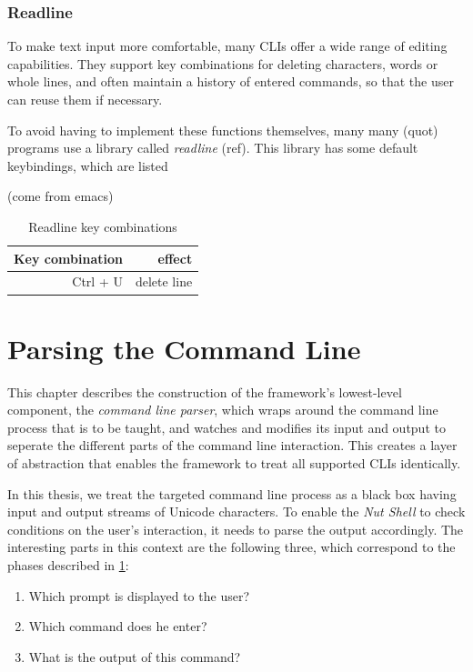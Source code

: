 \documentclass[paper=a4,twoside,abstract=on,cleardoublepage=empty,numbers=noenddot,toc=bib,12pt,appendixprefix=true]{scrreprt}
\begin{document}
\subsection{Readline}

To make text input more comfortable, many CLIs offer a wide range of editing capabilities. They support key combinations for deleting characters, words or whole lines, and often maintain a history of entered commands, so that the user can reuse them if necessary.

To avoid having to implement these functions themselves, many many (quot) programs use a library called \emph{readline} (ref). This library has some default keybindings, which are listed

(come from emacs)

\begin{table}[tb]
    \begin{tabular}{r|r}
        Key combination & effect \\
        \hline
        Ctrl + U & delete line \\
    \end{tabular}
    \caption{Readline key combinations}
\end{table}


\chapter{Parsing the Command Line}
\label{sec:cli}

This chapter describes the construction of the framework's lowest-level component, the \emph{command line parser}, which wraps around the command line process that is to be taught, and watches and modifies its input and output to seperate the different parts of the command line interaction. This creates a layer of abstraction that enables the framework to treat all supported CLIs identically.

In this thesis, we treat the targeted command line process as a black box having input and output streams of Unicode characters. To enable the \emph{Nut Shell} to check conditions on the user's interaction, it needs to parse the output accordingly. The interesting parts in this context are the following three, which correspond to the phases described in \cref{sec:cli}:

\begin{enumerate}
    \item Which prompt is displayed to the user?
    \item Which command does he enter?
    \item What is the output of this command?
\end{enumerate}
\end{document}

